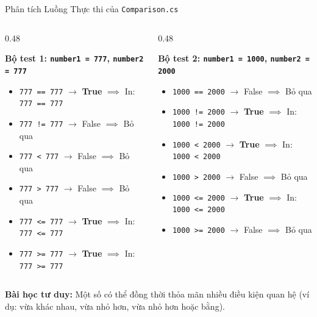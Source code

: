 \documentclass[aspectratio=169, 10pt]{beamer}
\begin{document}
\begin{frame}{Phân tích Luồng Thực thi của \texttt{Comparison.cs}}
  \begin{columns}[T]
    \begin{column}{0.48\textwidth}
      \begin{block}{\textbf{Bộ test 1: \texttt{number1 = 777}, \texttt{number2 = 777}}}
        \begin{itemize}\small
          \item \texttt{777 == 777} $\to$ \textbf{True} $\implies$ In: \texttt{777 == 777}
          \item \texttt{777 != 777} $\to$ False $\implies$ Bỏ qua
          \item \texttt{777 < 777}  $\to$ False $\implies$ Bỏ qua
          \item \texttt{777 > 777}  $\to$ False $\implies$ Bỏ qua
          \item \texttt{777 <= 777} $\to$ \textbf{True} $\implies$ In: \texttt{777 <= 777}
          \item \texttt{777 >= 777} $\to$ \textbf{True} $\implies$ In: \texttt{777 >= 777}
        \end{itemize}
      \end{block}
    \end{column}

    \begin{column}{0.48\textwidth}
      \begin{block}{\textbf{Bộ test 2: \texttt{number1 = 1000}, \texttt{number2 = 2000}}}
        \begin{itemize}\small
          \item \texttt{1000 == 2000} $\to$ False $\implies$ Bỏ qua
          \item \texttt{1000 != 2000} $\to$ \textbf{True} $\implies$ In: \texttt{1000 != 2000}
          \item \texttt{1000 < 2000}  $\to$ \textbf{True} $\implies$ In: \texttt{1000 < 2000}
          \item \texttt{1000 > 2000}  $\to$ False $\implies$ Bỏ qua
          \item \texttt{1000 <= 2000} $\to$ \textbf{True} $\implies$ In: \texttt{1000 <= 2000}
          \item \texttt{1000 >= 2000} $\to$ False $\implies$ Bỏ qua
        \end{itemize}
      \end{block}
    \end{column}
  \end{columns}
  \vspace{2mm}
  \begin{exampleblock}{\textbf{Bài học tư duy:}}
    Một số có thể đồng thời thỏa mãn nhiều điều kiện quan hệ (ví dụ: vừa khác nhau, vừa nhỏ hơn, vừa nhỏ hơn hoặc bằng).
  \end{exampleblock}
\end{frame}
\end{document}
